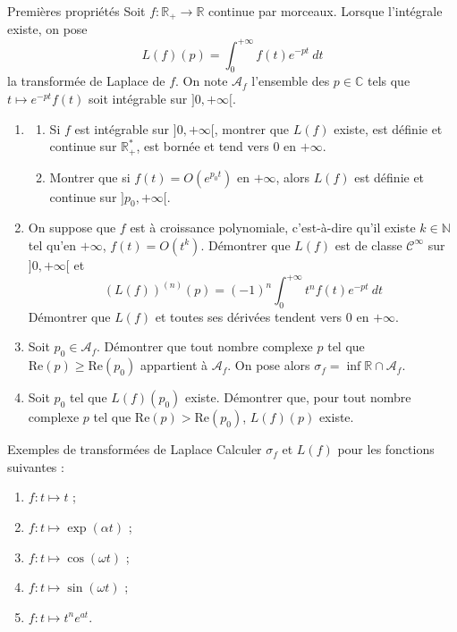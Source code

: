 \documentclass[french,a4paper]{article}
\newcommand{\N}{\mathbb{N}}
\newcommand{\R}{\mathbb{R}}
\newcommand{\C}{\mathbb{C}}
\newcommand{\st}{^*}
\theoremstyle{plain}
\theoremstyle{definition}
\theoremstyle{remark}
\begin{document}
\begin{ex}[Châteaux]{Premières propriétés}
	Soit $f:\R_+\to\R$ continue par morceaux. Lorsque l'intégrale existe, on pose $$L(f)(p)=\int_{0}^{+\infty}f(t)e^{-pt}\ dt$$ la transformée de Laplace de $f$. On note $\mathcal{A}_f$ l'ensemble des $p\in\C$ tels que $t\mapsto e^{-pt}f(t)$ soit intégrable sur $]0,+\infty[$.
	\begin{enumerate}
		\item \begin{enumerate}[label=\alph*.]
			\item Si $f$ est intégrable sur $]0,+\infty[$, montrer que $L(f)$ existe, est définie et continue sur $\R_+\st$, est bornée et tend vers $0$ en $+\infty$.
			\item Montrer que si $f(t)=O(e^{p_0t})$ en $+\infty$, alors $L(f)$ est définie et continue sur $]p_0,+\infty[$.
		\end{enumerate}
		\item On suppose que $f$ est à croissance polynomiale, c'est-à-dire qu'il existe $k\in\N$ tel qu'en $+\infty$, $f(t)=O(t^k)$. Démontrer que $L(f)$ est de classe $\mathcal{C}^\infty$ sur $]0,+\infty[$ et $$(L(f))^{(n)}(p)=(-1)^n\int_{0}^{+\infty}t^nf(t)e^{-pt}\ dt$$ Démontrer que $L(f)$ et toutes ses dérivées tendent vers $0$ en $+\infty$.
		\item Soit $p_0\in\mathcal{A}_f$. Démontrer que tout nombre complexe $p$ tel que $\text{Re}(p)\geqslant\text{Re}(p_0)$ appartient à $\mathcal{A}_f$. On pose alors $\sigma_f=\inf \R\cap\mathcal{A}_f$.
		\item Soit $p_0$ tel que $L(f)(p_0)$ existe. Démontrer que, pour tout nombre complexe $p$ tel que $\text{Re}(p)>\text{Re}(p_0)$, $L(f)(p)$ existe.
	\end{enumerate}
\end{ex}

\begin{ex}[Châteaux]{Exemples de transformées de Laplace}
	Calculer $\sigma_f$ et $L(f)$ pour les fonctions suivantes : 
	\begin{enumerate}
		\item $f:t\mapsto t$ ;
		\item $f:t\mapsto\exp(\alpha t)$ ;
		\item $f:t\mapsto\cos(\omega t)$ ;
		\item $f:t\mapsto\sin(\omega t)$ ;
		\item $f:t\mapsto t^ne^{at}$.
	\end{enumerate}
\end{ex}
\end{document}
